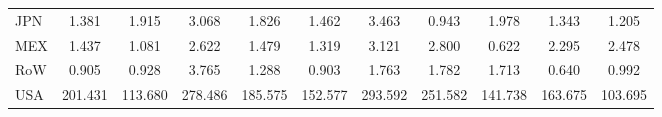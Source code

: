 \begin{table}[htbp]
\begin{tabular}{lcccccccccc}
  JPN & \textcolor[RGB]{189,122,66}{1.381} & \textcolor[RGB]{156,101,99}{1.915} & \textcolor[RGB]{122,79,133}{3.068} & \textcolor[RGB]{158,102,97}{1.826} & \textcolor[RGB]{176,114,79}{1.462} & \textcolor[RGB]{115,74,140}{3.463} & \textcolor[RGB]{222,144,33}{0.943} & \textcolor[RGB]{150,97,105}{1.978} & \textcolor[RGB]{191,124,64}{1.343} & \textcolor[RGB]{207,134,48}{1.205} \\ 
  MEX & \textcolor[RGB]{181,117,74}{1.437} & \textcolor[RGB]{214,139,41}{1.081} & \textcolor[RGB]{135,87,120}{2.622} & \textcolor[RGB]{173,112,82}{1.479} & \textcolor[RGB]{194,125,61}{1.319} & \textcolor[RGB]{120,78,135}{3.121} & \textcolor[RGB]{130,84,125}{2.800} & \textcolor[RGB]{247,160,8}{0.622} & \textcolor[RGB]{143,92,112}{2.295} & \textcolor[RGB]{138,89,117}{2.478} \\ 
  RoW & \textcolor[RGB]{232,150,23}{0.905} & \textcolor[RGB]{227,147,28}{0.928} & \textcolor[RGB]{105,68,150}{3.765} & \textcolor[RGB]{201,130,54}{1.288} & \textcolor[RGB]{235,152,20}{0.903} & \textcolor[RGB]{163,106,92}{1.763} & \textcolor[RGB]{161,104,94}{1.782} & \textcolor[RGB]{166,107,89}{1.713} & \textcolor[RGB]{245,158,10}{0.640} & \textcolor[RGB]{219,142,36}{0.992} \\ 
  USA & \textcolor[RGB]{41,26,214}{201.431} & \textcolor[RGB]{66,43,189}{113.680} & \textcolor[RGB]{28,18,227}{278.486} & \textcolor[RGB]{43,28,212}{185.575} & \textcolor[RGB]{56,36,199}{152.577} & \textcolor[RGB]{25,16,230}{293.592} & \textcolor[RGB]{36,23,219}{251.582} & \textcolor[RGB]{61,40,194}{141.738} & \textcolor[RGB]{48,31,207}{163.675} & \textcolor[RGB]{69,45,186}{103.695} \\ 
   \hline
\end{tabular}
\end{table}
